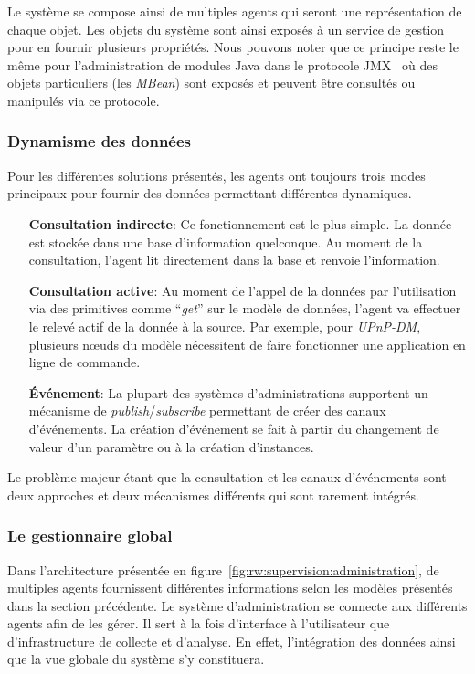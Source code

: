 Le système se compose ainsi de multiples agents qui seront une représentation de chaque objet. Les objets du système sont ainsi exposés à un service de gestion pour en fournir plusieurs propriétés. Nous pouvons noter que ce principe reste le même pour l'administration de modules Java dans le protocole JMX~\cite{Sun:JMX} où des objets particuliers (les \textit{MBean}) sont exposés et peuvent être consultés ou manipulés via ce protocole.

\subsubsection{Dynamisme des données}
Pour les différentes solutions présentés, les agents ont toujours trois modes principaux pour fournir des données permettant différentes dynamiques.
\begin{itemize}
	\item[\textbf{Consultation indirecte}: ] Ce fonctionnement est le plus simple. La donnée est stockée dans une base d'information quelconque. Au moment de la consultation, l'agent lit directement dans la base et renvoie l'information.
	\item[\textbf{Consultation active}: ] Au moment de l'appel de la données par l'utilisation via des primitives comme \enquote{\it get} sur le modèle de données, l'agent va effectuer le relevé actif de la donnée à la source. Par exemple, pour \textit{UPnP-DM}, plusieurs nœuds du modèle nécessitent de faire fonctionner une application en ligne de commande.
	\item[\textbf{Événement}: ] La plupart des systèmes d'administrations supportent un mécanisme de \textit{publish}/\textit{subscribe} permettant de créer des canaux d'événements. La création d'événement se fait à partir du changement de valeur d'un paramètre ou à la création d'instances.
\end{itemize}

Le problème majeur étant que la consultation et les canaux d'événements sont deux approches et deux mécanismes différents qui sont rarement intégrés.

\subsubsection{Le gestionnaire global}
Dans l'architecture présentée en figure~\ref{fig:rw:supervision:administration}, de multiples agents fournissent différentes informations selon les modèles présentés dans la section précédente. Le système d'administration se connecte aux différents agents afin de les gérer. Il sert à la fois d'interface à l'utilisateur que d'infrastructure de collecte et d'analyse. En effet, l'intégration des données ainsi que la vue globale du système s'y constituera.


